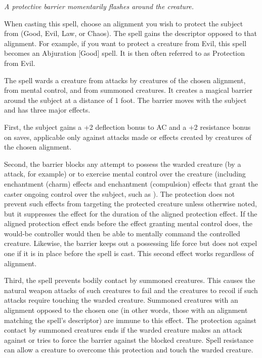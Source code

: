 \emph{A protective barrier momentarily flashes around the creature.}

When casting this spell, choose an alignment you wish to protect the subject from (Good, Evil, Law, or Chaos).
The spell gains the descriptor opposed to that alignment. For example, if you want to protect a creature from Evil, this spell becomes an Abjuration [Good] spell.
It is then often referred to as Protection from Evil.

The spell wards a creature from attacks by creatures of the chosen alignment, from mental control, and from summoned creatures. 
It creates a magical barrier around the subject at a distance of 1 foot. The barrier moves with the subject and has three major effects.

First, the subject gains a +2 deflection bonus to AC and a +2 resistance bonus on saves,
applicable only against attacks made or effects created by creatures of the chosen alignment.

Second, the barrier blocks any attempt to possess the warded creature (by a  attack, for example) or to exercise mental control over the creature (including enchantment (charm) effects and enchantment (compulsion) effects that grant the caster ongoing control over the subject, such as ). 
The protection does not prevent such effects from targeting the protected creature unless otherwise noted, but it suppresses the effect for the duration of the aligned protection effect. 
If the aligned protection effect ends before the effect granting mental control does, the would-be controller would then be able to mentally command the controlled creature. 
Likewise, the barrier keeps out a possessing life force but does not expel one if it is in place before the spell is cast. 
This second effect works regardless of alignment.

Third, the spell prevents bodily contact by summoned creatures. 
This causes the natural weapon attacks of such creatures to fail and the creatures to recoil if such attacks require touching the warded creature. 
Summoned creatures with an alignment opposed to the chosen one (in other words, those with an alignment matching the spell's descriptor) are immune to this effect. 
The protection against contact by summoned creatures ends if the warded creature makes an attack against or tries to force the barrier against the blocked creature. 
Spell resistance can allow a creature to overcome this protection and touch the warded creature.

